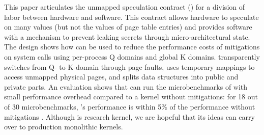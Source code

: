 \label{s:concl}

This paper articulates the unmapped speculation contract (\contract)
for a division of labor between hardware and software.  This contract
allows hardware to speculate on many values (but not the values of
page table entries) and provides software with a mechanism to prevent
leaking secrets through micro-architectural state.  The \sys design
shows how \contract can be used to reduce the performance costs of
mitigations on system calls using per-process Q domains and global K
domains.  \sys transparently switches from Q- to K-domain through page
faults, uses temporary mappings to access unmapped physical pages, and
splits data structures into public and private parts.  An evaluation
shows that \sys can run the microbenchmarks of \bench with small
performance overhead compared to a kernel without mitigations: for
18 out of 30 \bench microbenchmarks, \sys's performance is within 5\%
of the performance without mitigations
.  Although \sys is research kernel, we are hopeful that its
ideas can carry over to production monolithic kernels.
